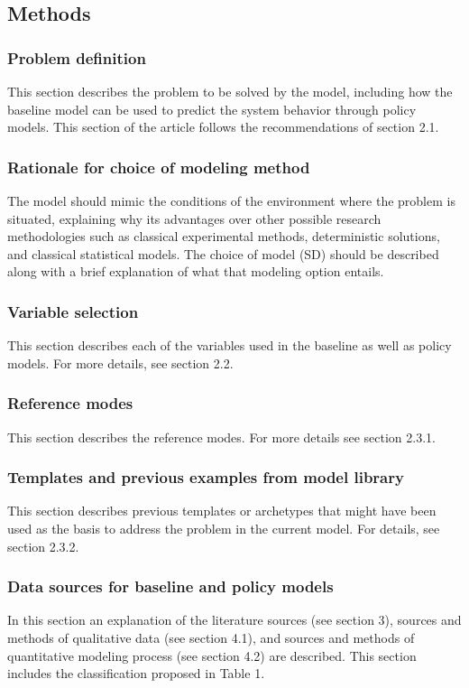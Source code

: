 \documentclass[11pt]{article}
\begin{document}
\subsection {Methods}

\subsubsection {Problem definition}
This section describes the problem to be solved by the model, including how the baseline model can be used to predict the system behavior through policy models.  This section of the article follows the recommendations of section 2.1. 

\subsubsection {Rationale for choice of modeling method}
The model should mimic the conditions of the environment where the problem is situated, explaining why its advantages over other possible research methodologies such as classical experimental methods, deterministic solutions, and classical statistical models. The choice of model (SD) should be described along with a brief explanation of what that modeling option entails.

\subsubsection {Variable selection}
This section describes each of the variables used in the baseline as well as policy models.  For more details, see section 2.2.

\subsubsection {Reference modes}
This section describes the reference modes.  For more details see section 2.3.1.

\subsubsection {Templates and previous examples from model library}
This section describes previous templates or archetypes that might have been used as the basis to address the problem in the current model.  For details, see section 2.3.2.

\subsubsection {Data sources for baseline and policy models}
In this section an explanation of the literature sources (see section 3), sources and methods of qualitative data (see section 4.1), and sources and methods of quantitative modeling process (see section 4.2) are described.  This section includes the classification proposed in Table 1.
\end{document}
